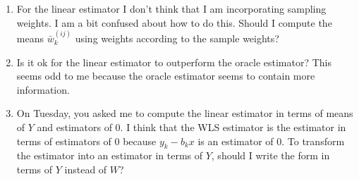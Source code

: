\documentclass[12pt]{article}
\begin{document}
\begin{enumerate}
  \item For the linear estimator I don't think that I am incorporating sampling
    weights. I am a bit confused about how to do this. Should I compute the 
    means $\bar w_{k}^{(ij)}$ using weights according to the sample weights? 
  \item Is it ok for the linear estimator to outperform the oracle estimator?
    This seems odd to me because the oracle estimator seems to contain more 
    information.
  \item On Tuesday, you asked me to compute the linear estimator in terms of 
    means of $Y$ and estimators of $0$. I think that the WLS estimator is the 
    estimator in terms of estimators of $0$ because $y_k - b_k x$ is an 
    estimator of $0$. To transform the estimator into an estimator in terms of
    $Y$, should I write the form in terms of $Y$ instead of $W$?
\end{enumerate}
\end{document}
